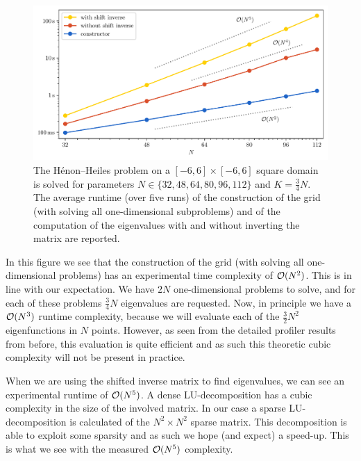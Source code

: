 \begin{figure}
    \begin{center}
        \includegraphics[width=\textwidth]{img/chapter4/benchmark/benchmark_timings.pdf}
    \end{center}
    \caption{The Hénon--Heiles problem on a $[-6,6] \times [-6,6]$ square domain is solved for parameters $N \in \{32,48,64,80,96,112\}$ and $K = \frac{3}{4}N$. The average runtime (over five runs) of the construction of the grid (with solving all one-dimensional subproblems) and of the computation of the eigenvalues with and without inverting the matrix are reported.\label{fig:c4_benchmark_timings}}
\end{figure}

In this figure we see that the construction of the grid (with solving all one-dimensional problems) has an experimental time complexity of $\operatorname{\mathcal{O}}(N^2)$. This is in line with our expectation. We have $2 N$ one-dimensional problems to solve, and for each of these problems $\frac{3}{4}N$ eigenvalues are requested. Now, in principle we have a $\operatorname{\mathcal{O}}(N^3)$ runtime complexity, because we will evaluate each of the $\frac{3}{2} N^2$ eigenfunctions in $N$ points. However, as seen from the detailed profiler results from before, this evaluation is quite efficient and as such this theoretic cubic complexity will not be present in practice.

When we are using the shifted inverse matrix to find eigenvalues, we can see an experimental runtime of $\operatorname{\mathcal{O}}(N^5)$. A dense LU-decomposition has a cubic complexity in the size of the involved matrix. In our case a sparse LU-decomposition is calculated of the $N^2 \times N^2$ sparse matrix. This decomposition is able to exploit some sparsity and as such we hope (and expect) a speed-up. This is what we see with the measured $\operatorname{\mathcal{O}}(N^5)$ complexity.

